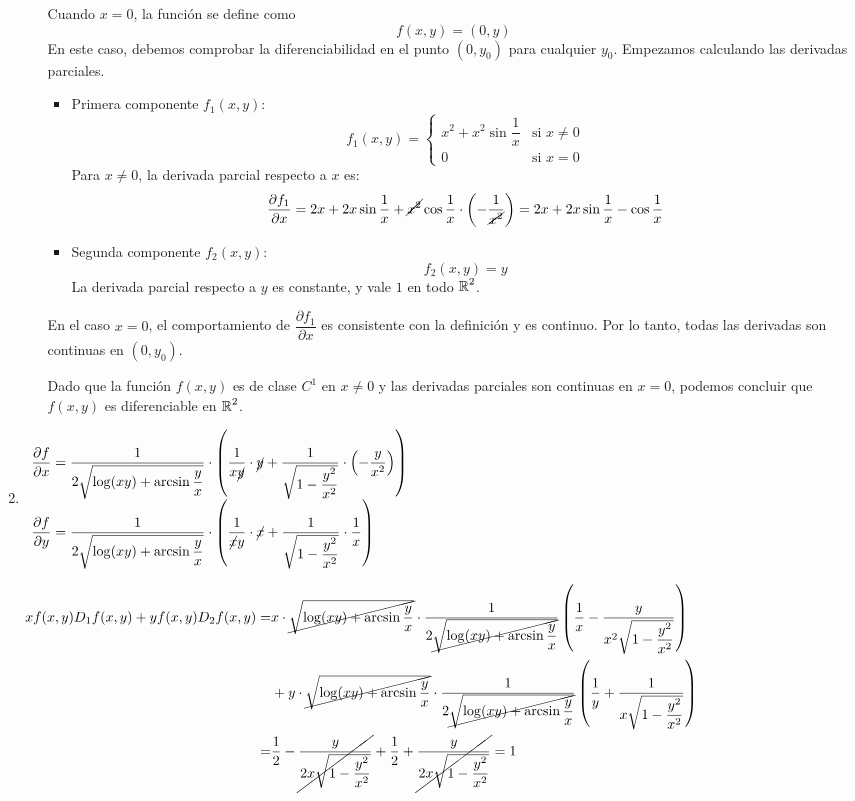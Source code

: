 \begin{enumerate}[label=\c olor{red}\textbf{\arabic*)}, leftmargin=*]
\begin{itemize}
Cuando $x=0$, la función se define como \[ f(x,y)=(0,y) \]En este caso, debemos comprobar la diferenciabilidad en el punto $(0,y_0)$ para cualquier $y_0$. Empezamos calculando las derivadas parciales.
\begin{itemize}[label=\textbullet]
	\item Primera componente $f_1(x,y)$: \[ f_1(x,y)=\begin{cases}
	x^{2}+x^{2}\sin\dfrac{1}{x} & \text{si }x\neq0\\
	0 & \text{si }x=0
	\end{cases} \] Para $x\neq0$, la derivada parcial respecto a $x$ es: \[ \dfrac{\partial f_1}{\partial x}=2x+2x\sin\dfrac{1}{x}+\cancel{x^{2}}\cos\dfrac{1}{x}\cdot\left(-\dfrac{1}{\cancel{x^{2}}}\right)=2x+2x\sin\dfrac{1}{x}-\cos\dfrac{1}{x} \]
	\item Segunda componente $f_2(x,y)$: \[ f_2(x,y)=y \] La derivada parcial respecto a $y$ es constante, y vale $1$ en todo $\operatorname{\mathbb{R}}^{2}$.
\end{itemize}
En el caso $x=0$, el comportamiento de $\dfrac{\partial f_1}{\partial x}$ es consistente con la definición y es continuo. Por lo tanto, todas las derivadas son continuas en $(0,y_0)$.

Dado que la función $f(x,y)$ es de clase $C^{1}$ en $x\neq0$ y las derivadas parciales son continuas en $x=0$, podemos concluir que $f(x,y)$ es diferenciable en $\operatorname{\mathbb{R}}^{2}$.
\end{itemize}

\item {}

$\begin{array}{l}
\dfrac{\partial f}{\partial x}=\dfrac{1}{2\sqrt{\log(xy)+\arcsin\dfrac{y}{x}}}\cdot\left(\dfrac{1}{x\cancel{y}}\cdot \cancel{y}+\dfrac{1}{\sqrt{1-\dfrac{y^{2}}{x^{2}}}}\cdot\left(-\dfrac{y}{x^{2}}\right)\right)\\
\dfrac{\partial f}{\partial y}=\dfrac{1}{2\sqrt{\log(xy)+\arcsin\dfrac{y}{x}}}\cdot\left(\dfrac{1}{\cancel{x}y}\cdot\cancel{x}+\dfrac{1}{\sqrt{1-\dfrac{y^{2}}{x^{2}}}}\cdot\dfrac{1}{x}\right)
\end{array}$

$\begin{aligned}
xf(x,y)D_1f(x,y)+yf(x,y)D_2f(x,y)=&x\cdot\cancel{\sqrt{\log(xy)+\arcsin\dfrac{y}{x}}}\cdot\dfrac{1}{2\cancel{\sqrt{\log(xy)+\arcsin\dfrac{y}{x}}}}\left(\dfrac{1}{x}-\dfrac{y}{x^{2}\sqrt{1-\dfrac{y^{2}}{x^{2}}}}\right)\\
&+y\cdot\cancel{\sqrt{\log(xy)+\arcsin\dfrac{y}{x}}}\cdot\dfrac{1}{2\cancel{\sqrt{\log(xy)+\arcsin\dfrac{y}{x}}}}\left(\dfrac{1}{y}+\dfrac{1}{x\sqrt{1-\dfrac{y^{2}}{x^{2}}}}\right)\\
=&\dfrac{1}{2}-\cancel{\dfrac{y}{2x\sqrt{1-\dfrac{y^{2}}{x^{2}}}}}+\dfrac{1}{2}+\cancel{\dfrac{y}{2x\sqrt{1-\dfrac{y^{2}}{x^{2}}}}}=1
\end{aligned}$


\end{enumerate}
